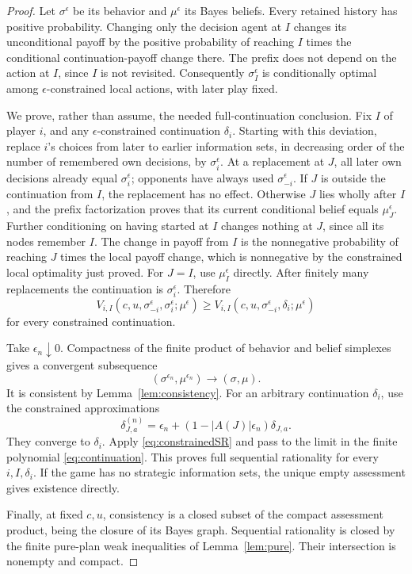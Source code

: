 \documentclass[11pt,a4paper]{article}
\numberwithin{equation}{section}
\theoremstyle{definition}
\begin{document}
\begin{proof}
Let \(\sigma^\epsilon\) be its behavior and \(\mu^\epsilon\) its Bayes
beliefs. Every retained history has positive probability.
Changing only the decision agent at \(I\) changes its unconditional
payoff by the positive probability of reaching \(I\) times the
conditional continuation-payoff change there.
The prefix does not depend on the action at \(I\), since \(I\)
is not revisited. Consequently \(\sigma_I^\epsilon\) is conditionally
optimal among \(\epsilon\)-constrained local actions, with later play fixed.

We prove, rather than assume, the needed full-continuation conclusion.
Fix \(I\) of player \(i\), and any \(\epsilon\)-constrained continuation
\(\delta_i\). Starting with this deviation, replace \(i\)'s choices
from later to earlier information sets, in decreasing order of the
number of remembered own decisions, by \(\sigma_i^\epsilon\).
At a replacement at \(J\), all later own decisions already equal
\(\sigma_i^\epsilon\); opponents have always used
\(\sigma_{-i}^\epsilon\).
If \(J\) is outside the continuation from \(I\), the replacement has
no effect. Otherwise \(J\) lies wholly after \(I\), and the prefix
factorization proves that its current conditional belief equals
\(\mu_J^\epsilon\).
Further conditioning on having started at \(I\) changes nothing at
\(J\), since all its nodes remember \(I\).
The change in payoff from \(I\) is the nonnegative probability of
reaching \(J\) times the local payoff change, which is nonnegative
by the constrained local optimality just proved.
For \(J=I\), use \(\mu_I^\epsilon\) directly.
After finitely many replacements the continuation is
\(\sigma_i^\epsilon\). Therefore
\begin{equation}\label{eq:constrainedSR}
 V_{i,I}(c,u,\sigma_{-i}^\epsilon,\sigma_i^\epsilon;\mu^\epsilon)
 \ge
 V_{i,I}(c,u,\sigma_{-i}^\epsilon,\delta_i;\mu^\epsilon)
\end{equation}
for every constrained continuation.

Take \(\epsilon_n\downarrow0\). Compactness of the finite product of
behavior and belief simplexes gives a convergent subsequence
\[
 (\sigma^{\epsilon_n},\mu^{\epsilon_n})\longrightarrow(\sigma,\mu).
\]
It is consistent by Lemma~\ref{lem:consistency}.
For an arbitrary continuation \(\delta_i\), use the constrained
approximations
\[
 \delta_{J,a}^{(n)}
 =\epsilon_n+(1-|A(J)|\epsilon_n)\delta_{J,a}.
\]
They converge to \(\delta_i\).
Apply \eqref{eq:constrainedSR} and pass to the limit in the finite
polynomial \eqref{eq:continuation}.
This proves full sequential rationality for every \(i,I,\delta_i\).
If the game has no strategic information sets, the unique empty
assessment gives existence directly.

Finally, at fixed \(c,u\), consistency is a closed subset of the
compact assessment product, being the closure of its Bayes graph.
Sequential rationality is closed by the finite pure-plan weak
inequalities of Lemma~\ref{lem:pure}.
Their intersection is nonempty and compact.
\end{proof}
\end{document}
